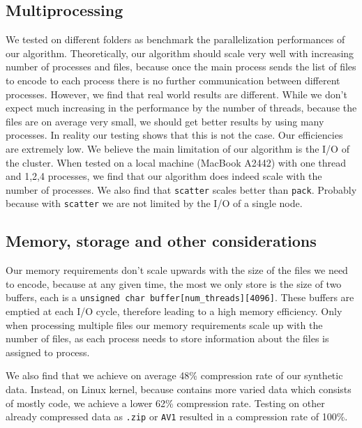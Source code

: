 \subsection{Multiprocessing}
We tested on different folders as benchmark the parallelization performances of our algorithm. Theoretically, our algorithm should scale very well with increasing number of processes and files, because once the main process sends the list of files to encode to each process there is no further communication between different processes. However, we find that real world results are different. 
While we don't expect much increasing in the performance by the number of threads, because the files are on average very small, we should get better results by using many processes.
In reality our testing shows that this is not the case. Our efficiencies are extremely low. We believe the main limitation of our algorithm is the I/O of the cluster. When tested on a local machine (MacBook A2442) with one thread and 1,2,4 processes, we find that our algorithm does indeed scale with the number of processes.
We also find that \verb|scatter| scales better than \verb|pack|. Probably because with \verb|scatter| we are not limited by the I/O of a single node.
\subsection{Memory, storage and other considerations}
Our memory requirements don't scale upwards with the size of the files we need to encode, because at any given time, the most we only store is the size of two buffers, each is a \verb|unsigned char buffer[num_threads][4096]|. These buffers are emptied at each I/O cycle, therefore leading to a high memory efficiency. Only when processing multiple files our memory requirements scale up with the number of files, as each process needs to store information about the files is assigned to process.

We also find that we achieve on average 48\% compression rate of our synthetic data. Instead, on Linux kernel, because contains more varied data which consists of mostly code, we achieve a lower 62\% compression rate. Testing on other already compressed data as \verb|.zip| or \verb|AV1| resulted in a compression rate of 100\%.
